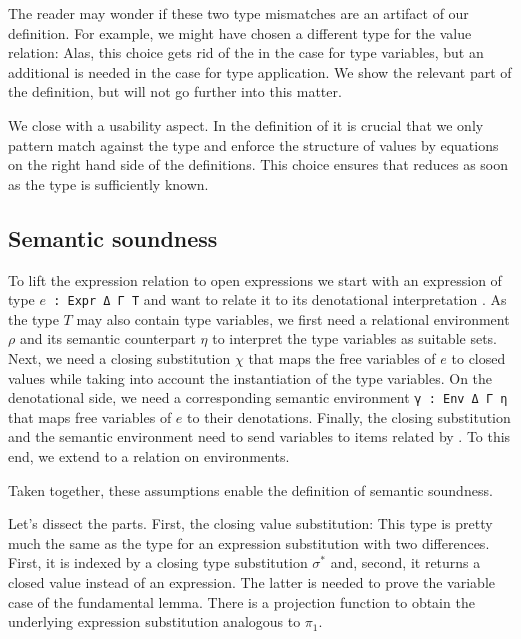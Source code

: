 \documentclass[acmsmall,anonymous,review,screen]{acmart}
\begin{document}
The reader may wonder if these two type mismatches are an
artifact of our definition. For example, we might have chosen a
different type for the value relation:
\LogicalVariationMCVType
Alas, this choice gets rid of the {\Asubst} in the case for type
variables, but an additional {\Asubst} is needed in the case for type
application. We show the relevant part of the definition, but will not go further into this matter.
\LogicalVariationMCVBodyUniversal

We close with a usability aspect.
In the definition of {\AVSem} it is crucial that we only pattern match
against the type and enforce the structure of values by equations on
the right hand side of the definitions. This choice ensures that {\AVSem}
reduces as soon as the type is sufficiently known.

\subsection{Semantic soundness}
\label{sec:relat-open-expr}

To lift the expression relation {\AESem} to open expressions we start
with an expression of type \texttt{$e$ : Expr Δ Γ T} and want to relate it
to its denotational interpretation . As the type $T$
may also contain type variables, we first need a relational
environment $\rho$ and its semantic counterpart $\eta$ to interpret
the type variables as suitable sets.
Next, we need a closing substitution $\chi$ that maps the free
variables of $e$ to closed values while taking into account the
instantiation of the type variables. On the denotational side, we need
a corresponding semantic environment \texttt{γ : Env Δ Γ η} that maps
free variables of $e$ to their denotations. Finally, the closing
substitution and the semantic environment need to send variables to
items related by {\AVSem}. To this end, we extend {\AVSem} to a
relation {\AGSem} on environments.

Taken together, these assumptions enable the definition of semantic soundness.
\FundamentalSemanticSoundness

Let's dissect the parts. First, the closing value substitution:
\LogicalCSub
This type is pretty much the same as the type for an expression
substitution with two differences. First, it is indexed by a closing
type substitution $\sigma^*$ and, second, it returns a closed value instead of an
expression. The latter is needed to prove the variable case of the
fundamental lemma. There is a projection function to obtain the
underlying expression substitution analogous to $\pi_1$.
\LogicalESSC
\end{document}
